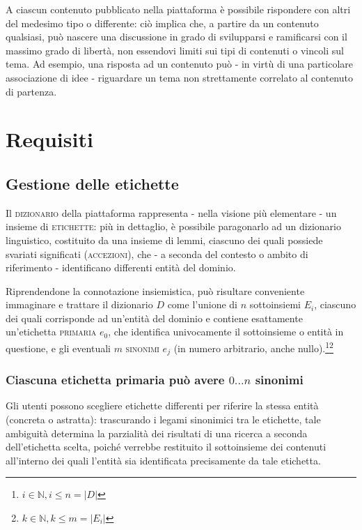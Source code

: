 \documentclass[10pt,a4paper,headinclude,footinclude,hidelinks]{scrreprt} %
\begin{document}
	A ciascun contenuto pubblicato nella piattaforma è possibile rispondere con altri del medesimo tipo o differente: ciò implica che, a partire da un contenuto qualsiasi, può nascere una discussione in grado di svilupparsi e ramificarsi con il massimo grado di libertà, non essendovi limiti sui tipi di contenuti o vincoli sul tema. Ad esempio, una risposta ad un contenuto può - in virtù di una particolare associazione di idee - riguardare un tema non strettamente correlato al contenuto di partenza.
	

	\chapter{Requisiti}
	\label{ch:stage:req}
	
	\section{Gestione delle etichette}
	\label{sec:stage:req:tag}
	
	Il \textsc{dizionario} della piattaforma rappresenta - nella visione più elementare - un insieme di \textsc{etichette}: più in dettaglio, è possibile paragonarlo ad un dizionario linguistico, costituito da una insieme di lemmi, ciascuno dei quali possiede svariati significati (\textsc{accezioni}), che - a seconda del contesto o ambito di riferimento - identificano differenti entità del dominio.

Riprendendone la connotazione insiemistica, può risultare conveniente immaginare e trattare il dizionario $D$ come l'unione di $n$ sottoinsiemi $E_i$, ciascuno dei quali corrisponde ad un'entità del dominio e contiene esattamente un'etichetta \textsc{primaria} $e_0$, che identifica univocamente il sottoinsieme o entità in questione, e gli eventuali $m$ \textsc{sinonimi} $e_j$ (in numero arbitrario, anche nullo).\footnote{$i \in \mathbb{N}, i \leq n=\left|D\right|$}\footnote{$k \in \mathbb{N}, k \leq m=\left|E_i\right|$}


	\subsection[Sinonimi]{Ciascuna etichetta primaria può avere $0...n$ sinonimi}
	Gli utenti possono scegliere etichette differenti per riferire la stessa entità (concreta o astratta): trascurando i legami sinonimici tra le etichette, tale ambiguità determina la parzialità dei risultati di una ricerca a seconda dell'etichetta scelta, poiché verrebbe restituito il sottoinsieme dei contenuti all'interno dei quali l'entità sia identificata precisamente da tale etichetta.
	
\end{document}
